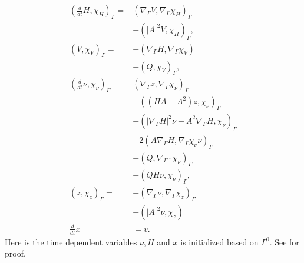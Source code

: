 \begin{subequations}
\begin{align}
\label{eq:WE_weak_form}
\left( \frac{d}{dt}H, \chi _{H} \right)_{\Gamma } =&  \left( \nabla _{\Gamma } V, \nabla _{\Gamma }\chi _{H} \right) _{\Gamma } \nonumber \\
                                                   &- \left( \left\lvert A \right\rvert ^2 V, \chi _{H} \right) _{\Gamma },   \\
\left( V, \chi _{V} \right)_{\Gamma } =& -\left( \nabla _{\Gamma } H, \nabla _{\Gamma } \chi _{V} \right) \nonumber \\
 & + \left( Q, \chi _{V} \right)_{\Gamma },   \\
\left( \frac{d}{dt} \nu , \chi _{\nu } \right)_{\Gamma } =& \left( \nabla _{\Gamma }z, \nabla _{\Gamma } \chi _{\nu } \right) _{\Gamma }\nonumber   \\
 & + \left( ( HA - A^2  )z,\chi_\nu  \right)_{\Gamma }   \nonumber \\
 & + \left( \left\lvert \nabla _{\Gamma } H \right\rvert^2 \nu + A^2\nabla _{\Gamma } H, \chi _{\nu }  \right)_{\Gamma} \nonumber  \\
 & + 2 \left( A \nabla _{\Gamma } H, \nabla _{\Gamma } \chi _{\nu } \nu  \right)_{\Gamma} \nonumber    \\
 &  + \left( Q, \nabla _{\Gamma } \cdot \chi _{\nu }  \right)_{\Gamma } \nonumber  \\
  &- \left( QH\nu , \chi _{\nu } \right) _{\Gamma},\\
\left( z, \chi _{z} \right) _{\Gamma }  =& - \left( \nabla _{\Gamma } \nu , \nabla _{\Gamma } \chi _{z} \right)_{\Gamma} \nonumber \\
 & + \left( \left\lvert A \right\rvert ^2 \nu , \chi _{z} \right) \\
\frac{d}{dt}x &= v
.\end{align}
\end{subequations}
Here is the time dependent variables $\nu, H $ and $x$ is initialized based on $\Gamma ^{0}$. See \cite{kovacs2021convergent} for proof.












